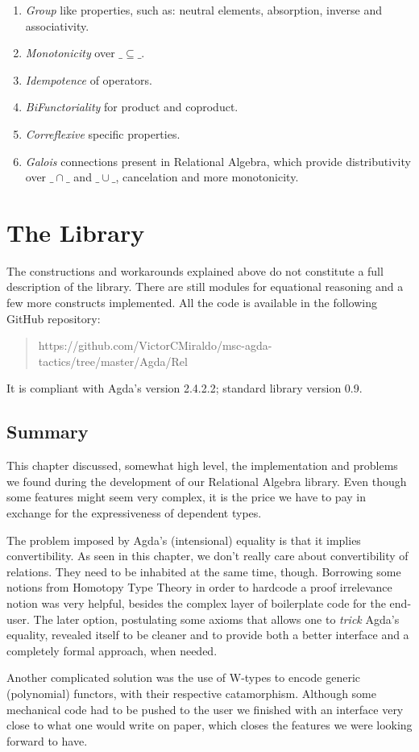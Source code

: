 \begin{enumerate}
  \item \emph{Group} like properties, such as: neutral elements, absorption, inverse and associativity.
  \item \emph{Monotonicity} over $\_\subseteq\_$.
  \item \emph{Idempotence} of operators.
  \item \emph{BiFunctoriality} for product and coproduct.
  \item \emph{Correflexive} specific properties.
  \item \emph{Galois} connections present in Relational Algebra, which provide
                distributivity over $\_\cap\_$ and $\_\cup\_$, cancelation and
                more monotonicity.
\end{enumerate}

\section{The Library}

The constructions and workarounds explained above do not constitute a full description of the library.
There are still modules for equational reasoning and a few more constructs implemented.
All the code is available in the following GitHub repository: 
\begin{quote}
\small https://github.com/VictorCMiraldo/msc-agda-tactics/tree/master/Agda/Rel
\end{quote}
It is compliant with Agda's version 2.4.2.2; standard library version 0.9.

\subsection{Summary}

This chapter discussed, somewhat high level, the implementation and problems
we found during the development of our Relational Algebra library. Even though some features
might seem very complex, it is the price we have to pay in exchange for the expressiveness 
of dependent types. 

The problem imposed by Agda's (intensional) equality is that it implies
convertibility. As seen in this chapter, we don't really care about convertibility of relations.
They need to be inhabited at the same time, though. 
Borrowing some notions from Homotopy Type Theory\cite{hottbook}
in order to hardcode a proof irrelevance notion was very helpful, besides the complex layer of boilerplate
code for the end-user. The later option, postulating some axioms that allows one to \emph{trick}
Agda's equality, revealed itself to be cleaner and to provide both a better interface
and a completely formal approach, when needed.

Another complicated solution was the use of W-types to encode generic (polynomial) functors,
with their respective catamorphism. Although some mechanical code had to be pushed to the user
we finished with an interface very close to what one would write on paper, which closes
the features we were looking forward to have.



